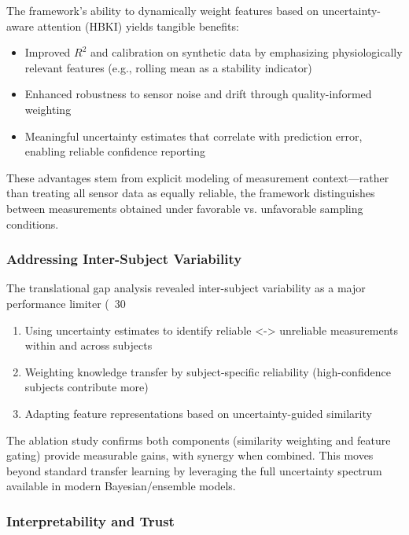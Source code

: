 \documentclass{ieeeaccess}
\begin{document}
The framework's ability to dynamically weight features based on uncertainty-aware attention (HBKI) yields tangible benefits:
\begin{itemize}
\item Improved $R^2$ and calibration on synthetic data by emphasizing physiologically relevant features (e.g., rolling mean as a stability indicator)
\item Enhanced robustness to sensor noise and drift through quality-informed weighting
\item Meaningful uncertainty estimates that correlate with prediction error, enabling reliable confidence reporting
\end{itemize}
These advantages stem from explicit modeling of measurement context—rather than treating all sensor data as equally reliable, the framework distinguishes between measurements obtained under favorable vs. unfavorable sampling conditions.

\subsubsection{Addressing Inter-Subject Variability}

The translational gap analysis revealed inter-subject variability as a major performance limiter (~30%
\begin{enumerate}
\item Using uncertainty estimates to identify reliable <-> unreliable measurements within and across subjects
\item Weighting knowledge transfer by subject-specific reliability (high-confidence subjects contribute more)
\item Adapting feature representations based on uncertainty-guided similarity
\end{enumerate}
The ablation study confirms both components (similarity weighting and feature gating) provide measurable gains, with synergy when combined. This moves beyond standard transfer learning by leveraging the full uncertainty spectrum available in modern Bayesian/ensemble models.

\subsubsection{Interpretability and Trust}
\end{document}
